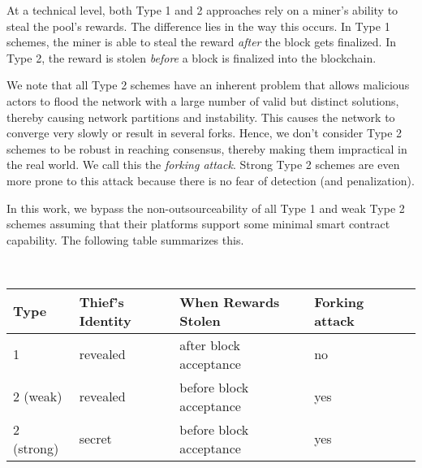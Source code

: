 \documentclass[11pt]{article}
\begin{document}
At a technical level, both Type 1 and 2 approaches rely on a miner's ability to steal the pool's rewards. The difference lies in the way this occurs. In Type 1 schemes, the miner is able to steal the reward {\em after} the block gets finalized.
In Type 2, 
the reward is stolen {\em before} a block is finalized into the blockchain. 


We note that all Type 2 schemes have an inherent problem that allows malicious actors to flood the network with a large number of valid but distinct solutions, thereby causing network partitions and instability. This causes the network to converge very slowly or result in several forks. Hence, we don't consider Type 2 schemes to be robust in reaching consensus, thereby making them impractical in the real world. We call this the {\em forking attack}. Strong Type 2 schemes are even more prone to this attack because there is no fear of detection (and penalization).

In this work, we bypass the non-outsourceability of all Type 1 and weak Type 2 schemes assuming that their platforms support
some minimal smart contract capability. The following table summarizes this. 

~\\
	\begin{tabular}{lllll}
		  Type     & Thief's Identity   & When Rewards Stolen       & Forking attack  \\\hline
		  1        & revealed              & after block acceptance   & no             \\
		  2 (weak)   & revealed           & before block acceptance  & yes            \\
		  2 (strong) & secret           & before block acceptance  & yes            
	\end{tabular}

\end{document}

